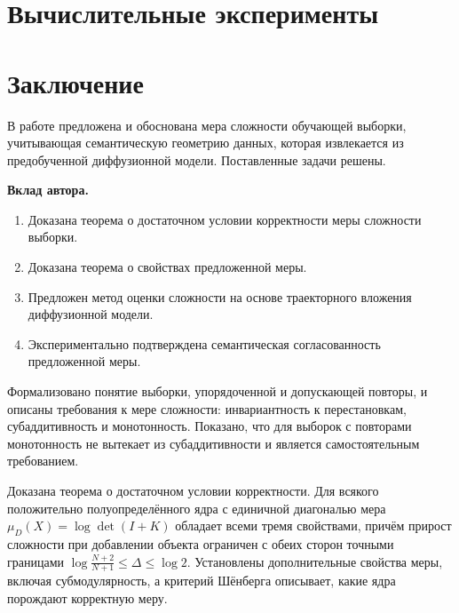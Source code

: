 \documentclass[14pt, a4paper]{extarticle}
\theoremstyle{definition}
\theoremstyle{plain}
\begin{document}
\section{Вычислительные эксперименты}
\label{sec:experiments}



\section{Заключение}
\label{sec:conclusion}

В работе предложена и обоснована мера сложности обучающей выборки, учитывающая
семантическую геометрию данных, которая извлекается из предобученной диффузионной
модели. Поставленные задачи решены.

\textbf{Вклад автора.}
\begin{enumerate}
    \item Доказана теорема о достаточном условии корректности меры сложности
          выборки.
    \item Доказана теорема о свойствах предложенной меры.
    \item Предложен метод оценки сложности на основе траекторного вложения
          диффузионной модели.
    \item Экспериментально подтверждена семантическая согласованность предложенной
          меры.
\end{enumerate}

Формализовано понятие выборки, упорядоченной и допускающей повторы, и описаны
требования к мере сложности: инвариантность к перестановкам, субаддитивность и
монотонность. Показано, что для выборок с повторами монотонность не вытекает из
субаддитивности и является самостоятельным требованием.

Доказана теорема о достаточном условии корректности. Для всякого положительно
полуопределённого ядра с единичной диагональю мера $\mu_D(X)=\log\det(I+K)$
обладает всеми тремя свойствами, причём прирост сложности при добавлении объекта
ограничен с обеих сторон точными границами
$\log\frac{N+2}{N+1}\le\Delta\le\log 2$. Установлены дополнительные свойства меры,
включая субмодулярность, а критерий Шёнберга описывает, какие ядра порождают
корректную меру.
\end{document}
